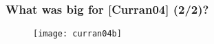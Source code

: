 \begin{frame}[plain]
	\frametitle{What was big for [Curran04] (2/2)?}
	\begin{block}{\begin{center}
    \end{center}} 
    \begin{center}
      \begin{figure}[H]
        \centering
        \texttt{[image: curran04b]}
      \end{figure}
    \end{center}
	\end{block} 
\end{frame}

